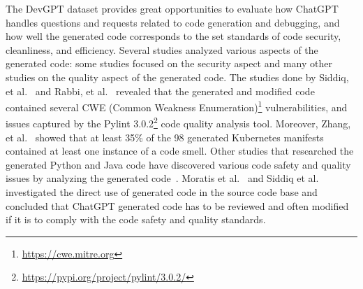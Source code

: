 The DevGPT dataset provides great opportunities to evaluate how ChatGPT handles questions and requests related to code generation and debugging, and how well the generated code corresponds to the set standards of code security, cleanliness, and efficiency. Several studies analyzed various aspects of the generated code: some studies focused on the security aspect and many other studies on the quality aspect of the generated code. The studies done by Siddiq, et al.~\cite{siddiq2023generate} and Rabbi, et al.~\cite{gpt-code-security-quality} revealed that the generated and modified code contained several CWE (Common Weakness Enumeration)\footnote{\url{https://cwe.mitre.org}} vulnerabilities, and issues captured by the Pylint 3.0.2\footnote{\url{https://pypi.org/project/pylint/3.0.2/}} code quality analysis tool. Moreover, Zhang, et al.~\cite{zhang2024-code-smell} showed that at least 35\% of the 98 generated Kubernetes manifests contained at least one instance of a code smell. Other studies that researched the generated Python and Java code have discovered various code safety and quality issues by analyzing the generated code~\cite{clark2024-quantitative-quality-analysis,Moratis2024-code-quality,Siddiq2024-code-quality}. Moratis et al.~\cite{Moratis2024-code-quality} and Siddiq et al.~\cite{Siddiq2024-code-quality} investigated the direct use of generated code in the source code base and concluded that ChatGPT generated code has to be reviewed and often modified if it is to comply with the code safety and quality standards. 

